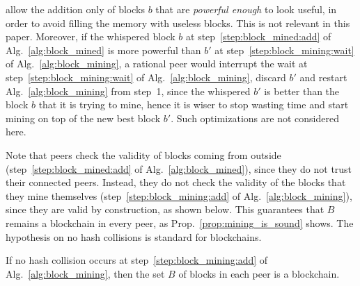 allow the addition only of blocks $b$ that are \emph{powerful enough} to look useful,
in order to avoid filling the memory with useless blocks. This is not relevant in this paper.
Moreover, if the whispered block $b$
at step~\ref{step:block_mined:add} of Alg.~\ref{alg:block_mined} is more
powerful than $b'$ at step~\ref{step:block_mining:wait} of Alg.~\ref{alg:block_mining},
a rational peer would interrupt the wait at step~\ref{step:block_mining:wait}
of Alg.~\ref{alg:block_mining}, discard $b'$ and restart Alg.~\ref{alg:block_mining}
from step~1, since the whispered $b'$ is better than the block $b$ that it is trying to mine,
hence it is wiser to stop wasting time and start mining on top of the new best block $b'$.
Such optimizations are not considered here.

Note that peers check the validity of blocks coming from outside
(step~\ref{step:block_mined:add} of Alg.~\ref{alg:block_mined}), since they do not trust
their connected peers. Instead, they do not check the validity of the blocks that they
mine themselves (step~\ref{step:block_mining:add} of Alg.~\ref{alg:block_mining}),
since they are valid by construction, as shown below. This
guarantees that $B$ remains a blockchain in every peer, as Prop.~\ref{prop:mining_is_sound} shows.
The hypothesis on no hash collisions is standard for blockchains.
%
\begin{proposition}\label{prop:mining_is_sound}
  If no hash collision occurs at step~\ref{step:block_mining:add} of Alg.~\ref{alg:block_mining},
  then the set $B$ of blocks in each peer is a blockchain.
\end{proposition}
